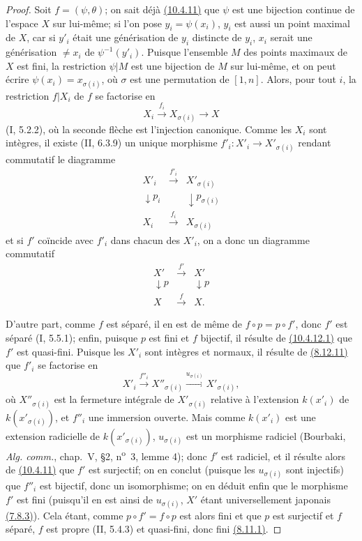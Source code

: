\begin{proof}
Soit $f=(\psi,\theta)$; on sait déjà
{\hyperref[canon-index.ega4.c04.statement.10-4-11]{(10.4.11)}} que $\psi$ est une
bijection continue de l'espace $X$ sur lui-même; si l'on pose
$y_i=\psi(x_i)$, $y_i$ est aussi un point maximal de $X$, car si $y'_i$
était une générisation de $y_i$ distincte de $y_i$, $x_i$ serait une
générisation $\neq x_i$ de $\psi^{-1}(y'_i)$. Puisque l'ensemble $M$
des points maximaux de $X$ est fini, la restriction $\psi|M$ est une
bijection de $M$ sur lui-même, et on peut écrire
$\psi(x_i)=x_{\sigma(i)}$, où $\sigma$ est une permutation de
$[1,n]$. Alors, pour tout $i$, la restriction $f|X_i$ de $f$ se
factorise en
\[
 X_i\xrightarrow{f_i}X_{\sigma(i)}\longrightarrow X
\]
(I, 5.2.2), où la seconde flèche est l'injection canonique. Comme les
$X_i$ sont intègres, il existe (II, 6.3.9) un unique morphisme
$f'_i:X'_i\to X'_{\sigma(i)}$ rendant commutatif le diagramme
\[
\begin{array}{ccc}
X'_i&\xrightarrow{f'_i}&X'_{\sigma(i)}\\
\downarrow p_i&&\downarrow p_{\sigma(i)}\\
X_i&\xrightarrow{f_i}&X_{\sigma(i)}
\end{array}
\]
et si $f'$ coïncide avec $f'_i$ dans chacun des $X'_i$, on a donc un
diagramme commutatif
\begin{equation}
\label{IV.10.4.12.1.errata}
\begin{array}{ccc}
X'&\xrightarrow{f'}&X'\\
\downarrow p&&\downarrow p\\
X&\xrightarrow{f}&X.
\end{array}
\tag{10.4.12.1}
\end{equation}

D'autre part, comme $f$ est séparé, il en est de même de
$f\circ p=p\circ f'$, donc $f'$ est séparé (I, 5.5.1); enfin, puisque
$p$ est fini et $f$ bijectif, il résulte de
{\hyperlink{ega4.c04.sec.10-4-12-1}{(10.4.12.1)}} que $f'$ est
quasi-fini. Puisque les $X'_i$ sont intègres et normaux, il résulte de
{\hyperref[canon-index.ega4.c04.cor.8-12-11]{(8.12.11)}} que $f'_i$ se factorise en
\[
 X'_i\xrightarrow{f''_i}X''_{\sigma(i)}
 \xrightarrow{u_{\sigma(i)}}X'_{\sigma(i)},
\]
où $X''_{\sigma(i)}$ est la fermeture intégrale de
$X'_{\sigma(i)}$ relative à l'extension $k(x'_i)$ de
$k(x'_{\sigma(i)})$, et $f''_i$ une immersion ouverte. Mais comme
$k(x'_i)$ est une extension radicielle de $k(x'_{\sigma(i)})$,
$u_{\sigma(i)}$ est un morphisme radiciel (Bourbaki,
\emph{Alg. comm.}, chap.~V, \S2, n\textsuperscript{o}~3, lemme 4);
donc $f'$ est radiciel, et il résulte alors de
{\hyperref[canon-index.ega4.c04.statement.10-4-11]{(10.4.11)}} que $f'$ est
surjectif; on en conclut (puisque les $u_{\sigma(i)}$ sont injectifs)
que $f''_i$ est bijectif, donc un isomorphisme; on en déduit enfin que
le morphisme $f'$ est fini (puisqu'il en est ainsi de $u_{\sigma(i)}$,
$X'$ étant universellement japonais
{\hyperref[canon-index.ega4.c04.statement.7-8-3]{(7.8.3)}}). Cela étant, comme
$p\circ f'=f\circ p$ est alors fini et que $p$ est surjectif et $f$
séparé, $f$ est propre (II, 5.4.3) et quasi-fini, donc fini
{\hyperref[canon-index.ega4.c04.thm.8-11-1]{(8.11.1)}}.


\end{proof}
